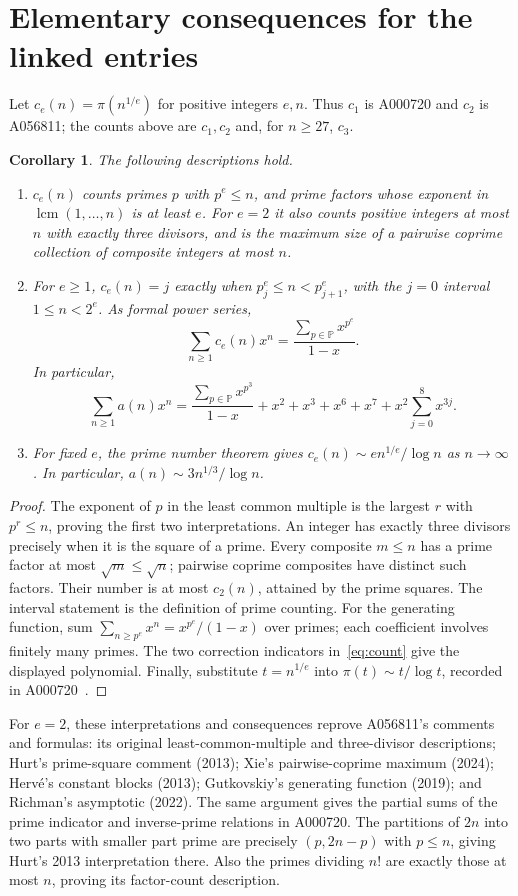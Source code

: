 \documentclass[11pt]{article}
\newtheorem{corollary}[theorem]{Corollary}
\newcommand{\pr}{\mathbb P}
\begin{document}
\section{Elementary consequences for the linked entries}
Let $c_e(n)=\pi(n^{1/e})$ for positive integers $e,n$. Thus $c_1$ is
A000720 and $c_2$ is A056811; the counts above are $c_1,c_2$ and,
for $n\ge27$, $c_3$.
\begin{corollary}\label{cor:linked}
The following descriptions hold.
\begin{enumerate}
\item $c_e(n)$ counts primes $p$ with $p^e\le n$, and prime factors
whose exponent in $\operatorname{lcm}(1,\ldots,n)$ is at least $e$.
For $e=2$ it also counts positive integers at most $n$ with exactly
three divisors, and is the maximum size of a pairwise coprime collection
of composite integers at most $n$.
\item For $e\ge1$, $c_e(n)=j$ exactly when
$p_j^e\le n<p_{j+1}^e$, with the $j=0$ interval $1\le n<2^e$.
As formal power series,
\[
 \sum_{n\ge1}c_e(n)x^n=\frac{\sum_{p\in\pr}x^{p^e}}{1-x}.
\]
In particular,
\[
 \sum_{n\ge1}a(n)x^n
 =\frac{\sum_{p\in\pr}x^{p^3}}{1-x}
   +x^2+x^3+x^6+x^7+x^2\sum_{j=0}^{8}x^{3j}.
\]
\item For fixed $e$, the prime number theorem gives
$c_e(n)\sim e n^{1/e}/\log n$ as $n\to\infty$. In particular,
$a(n)\sim3n^{1/3}/\log n$.
\end{enumerate}
\end{corollary}
\begin{proof}
The exponent of $p$ in the least common multiple is the largest $r$
with $p^r\le n$, proving the first two interpretations.
An integer has exactly three divisors precisely when it is the square
of a prime. Every composite $m\le n$ has a prime factor at most
$\sqrt m\le\sqrt n$; pairwise coprime composites have distinct such
factors. Their number is at most $c_2(n)$, attained by the prime squares.
The interval statement is the definition of prime counting.
For the generating function, sum $\sum_{n\ge p^e}x^n=x^{p^e}/(1-x)$
over primes; each coefficient involves finitely many primes.
The two correction indicators in~\eqref{eq:count} give the displayed
polynomial. Finally, substitute $t=n^{1/e}$ into
$\pi(t)\sim t/\log t$, recorded in A000720~\cite{pi}.
\end{proof}

For $e=2$, these interpretations and consequences reprove A056811's
comments and formulas: its original least-common-multiple and
three-divisor descriptions; Hurt's prime-square comment (2013);
Xie's pairwise-coprime maximum (2024); Herv\'e's constant blocks (2013);
Gutkovskiy's generating function (2019); and Richman's asymptotic (2022).
The same argument gives the partial sums of the prime indicator and
inverse-prime relations in A000720. The partitions of $2n$ into two
parts with smaller part prime are precisely $(p,2n-p)$ with $p\le n$,
giving Hurt's 2013 interpretation there. Also the primes dividing $n!$
are exactly those at most $n$, proving its factor-count description.
\end{document}
